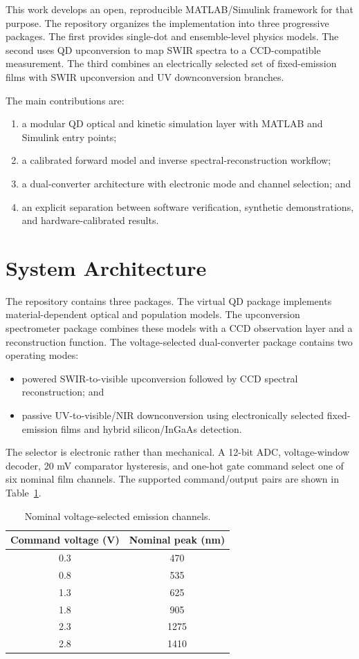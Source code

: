 \documentclass[conference]{IEEEtran}
\begin{document}
This work develops an open, reproducible MATLAB/Simulink framework for that purpose. The repository organizes the implementation into three progressive packages. The first provides single-dot and ensemble-level physics models. The second uses QD upconversion to map SWIR spectra to a CCD-compatible measurement. The third combines an electrically selected set of fixed-emission films with SWIR upconversion and UV downconversion branches.

The main contributions are:
\begin{enumerate}
    \item a modular QD optical and kinetic simulation layer with MATLAB and Simulink entry points;
    \item a calibrated forward model and inverse spectral-reconstruction workflow;
    \item a dual-converter architecture with electronic mode and channel selection; and
    \item an explicit separation between software verification, synthetic demonstrations, and hardware-calibrated results.
\end{enumerate}

\section{System Architecture}
The repository contains three packages. The virtual QD package implements material-dependent optical and population models. The upconversion spectrometer package combines these models with a CCD observation layer and a reconstruction function. The voltage-selected dual-converter package contains two operating modes:
\begin{itemize}
    \item powered SWIR-to-visible upconversion followed by CCD spectral reconstruction; and
    \item passive UV-to-visible/NIR downconversion using electronically selected fixed-emission films and hybrid silicon/InGaAs detection.
\end{itemize}

The selector is electronic rather than mechanical. A 12-bit ADC, voltage-window decoder, 20 mV comparator hysteresis, and one-hot gate command select one of six nominal film channels. The supported command/output pairs are shown in Table~\ref{tab:channels}.

\begin{table}[t]
\caption{Nominal voltage-selected emission channels.}
\label{tab:channels}
\centering
\begin{tabular}{cc}
\toprule
Command voltage (V) & Nominal peak (nm)\\
\midrule
0.3 & 470\\
0.8 & 535\\
1.3 & 625\\
1.8 & 905\\
2.3 & 1275\\
2.8 & 1410\\
\bottomrule
\end{tabular}
\end{table}
\end{document}
